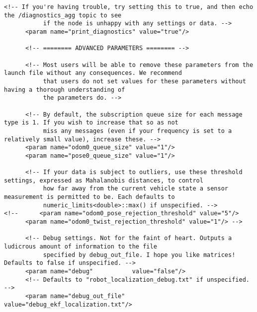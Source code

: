 \begin{lstlisting}[breaklines=true,basicstyle=\tiny]
      <!-- If you're having trouble, try setting this to true, and then echo the /diagnostics_agg topic to see
           if the node is unhappy with any settings or data. -->
      <param name="print_diagnostics" value="true"/>

      <!-- ======== ADVANCED PARAMETERS ======== -->

      <!-- Most users will be able to remove these parameters from the launch file without any consequences. We recommend
           that users do not set values for these parameters without having a thorough understanding of
           the parameters do. -->

      <!-- By default, the subscription queue size for each message type is 1. If you wish to increase that so as not
           miss any messages (even if your frequency is set to a relatively small value), increase these. -->
      <param name="odom0_queue_size" value="1"/>
      <param name="pose0_queue_size" value="1"/>

      <!-- If your data is subject to outliers, use these threshold settings, expressed as Mahalanobis distances, to control
           how far away from the current vehicle state a sensor measurement is permitted to be. Each defaults to
           numeric_limits<double>::max() if unspecified. -->
<!--      <param name="odom0_pose_rejection_threshold" value="5"/>
      <param name="odom0_twist_rejection_threshold" value="1"/> -->

      <!-- Debug settings. Not for the faint of heart. Outputs a ludicrous amount of information to the file
           specified by debug_out_file. I hope you like matrices! Defaults to false if unspecified. -->
      <param name="debug"           value="false"/>
      <!-- Defaults to "robot_localization_debug.txt" if unspecified. -->
      <param name="debug_out_file"  value="debug_ekf_localization.txt"/>


\end{lstlisting}
